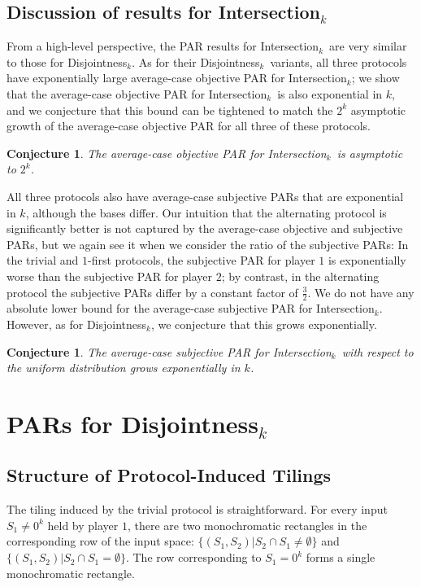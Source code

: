 \documentclass{article}
\theoremstyle{theorem}
\newtheorem{conj}[theorem]{Conjecture}
\theoremstyle{definition}
\theoremstyle{remark}
\newcommand{\disjoint}{{\sc Dis\-joint\-ness}\ensuremath{_k}}
\newcommand{\intersection}{{\sc In\-ter\-sec\-tion}\ensuremath{_k}}
\begin{document}
\subsection{Discussion of results for \intersection}

From a high-level perspective, the PAR results for \intersection\ are very similar to those for \disjoint.  As for their \disjoint\ variants, all three protocols have exponentially large average-case objective PAR for \intersection; we show that the average-case objective PAR for \intersection\ is also exponential in $k$, and we conjecture that this bound can be tightened to match the $2^k$ asymptotic growth of the average-case objective PAR for all three of these protocols.

\begin{conj}
The average-case objective PAR for \intersection\ is asymptotic to $2^k$.
\end{conj}

All three protocols also have average-case subjective PARs that are exponential in $k$, although the bases differ.  Our intuition that the alternating protocol is significantly better is not captured by the average-case objective and subjective PARs, but we again see it when we consider the ratio of the subjective PARs: In the trivial and $1$-first protocols, the subjective PAR for player $1$ is exponentially worse than the subjective PAR for player $2$; by contrast, in the alternating protocol the subjective PARs differ by a constant factor of $\frac{3}{2}$.  We do not have any absolute lower bound for the average-case subjective PAR for \intersection.  However, as for \disjoint, we conjecture that this grows exponentially.
\begin{conj}
The average-case subjective PAR for \intersection\ with respect to the uniform distribution grows exponentially in $k$.
\end{conj}


\section{PARs for \disjoint}\label{sec:disjoint}

\subsection{Structure of Protocol-Induced Tilings}


The tiling induced by the trivial protocol is straightforward.  For every input $S_1\neq 0^k$ held by player $1$, there are two monochromatic rectangles in the corresponding row of the input space: $\{(S_1,S_2)|S_2\cap S_1 \neq \emptyset\}$ and $\{(S_1,S_2)|S_2\cap S_1 = \emptyset\}$.  The row corresponding to $S_1=0^k$ forms a single monochromatic rectangle.
\end{document}
